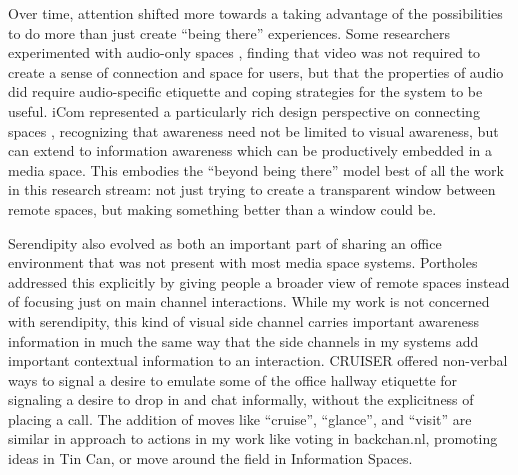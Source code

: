 \documentclass{tufte-handout}
\begin{document}
Over time, attention shifted more towards a taking advantage of the possibilities to do more than just create ``being there'' experiences. Some researchers experimented with audio-only spaces \citet{thunderwire}, finding that video was not required to create a sense of connection and space for users, but that the properties of audio did require audio-specific etiquette and coping strategies for the system to be useful. iCom represented a particularly rich design perspective on connecting spaces  \citet{stefan_icom}, recognizing that awareness need not be limited to visual awareness, but can extend to information awareness which can be productively embedded in a media space. This embodies the ``beyond being there'' model best of all the work in this research stream: not just trying to create a transparent window between remote spaces, but making something better than a window could be.




Serendipity also evolved as both an important part of sharing an office environment that was not present with most media space systems. Portholes \citet{portholes} addressed this explicitly by giving people a broader view of remote spaces instead of focusing just on main channel interactions. While my work is not concerned with serendipity, this kind of visual side channel carries important awareness information in much the same way that the side channels in my systems add important contextual information to an interaction. CRUISER \citet{fish_kraut_cruiser} offered non-verbal ways to signal a desire to emulate some of the office hallway etiquette for signaling a desire to drop in and chat informally, without the explicitness of placing a call. The addition of moves like ``cruise'', ``glance'', and ``visit'' are similar in approach to actions in my work like voting in backchan.nl, promoting ideas in Tin Can, or move around the field in Information Spaces. 
\end{document}
